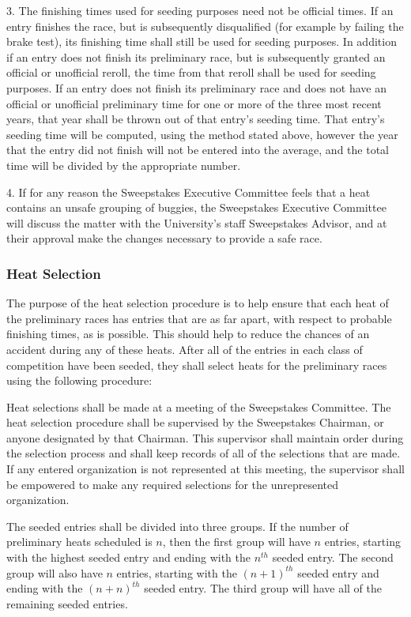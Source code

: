 3. The finishing times used for seeding purposes need not be official times. If an entry finishes the race, but is subsequently disqualified (for example by failing the brake test), its finishing time shall still be used for seeding purposes. In addition if an entry does not finish its preliminary race, but is subsequently granted an official or unofficial reroll, the time from that reroll shall be used for seeding purposes. If an entry does not finish its preliminary race and does not have an official or unofficial preliminary time for one or more of the three most recent years, that year shall be thrown out of that entry’s seeding time. That entry’s seeding time will be computed, using the method stated above, however the year that the entry did not finish will not be entered into the average, and the total time will be divided by the appropriate number.

4. If for any reason the Sweepstakes Executive Committee feels that a heat contains an unsafe grouping of buggies, the Sweepstakes Executive Committee will discuss the matter with the University’s staff Sweepstakes Advisor, and at their approval make the changes necessary to provide a safe race.

\subsubsection{Heat Selection}

The purpose of the heat selection procedure is to help ensure that each heat of the preliminary races has entries that are as far apart, with respect to probable finishing times, as is possible. This should help to reduce the chances of an accident during any of these heats. After all of the entries in each class of competition have been seeded, they shall select heats for the preliminary races using the following procedure:

Heat selections shall be made at a meeting of the Sweepstakes Committee. The heat selection procedure shall be supervised by the Sweepstakes Chairman, or anyone designated by that Chairman. This supervisor shall maintain order during the selection process and shall keep records of all of the selections that are made. If any entered organization is not represented at this meeting, the supervisor shall be empowered to make any required selections for the unrepresented organization.

The seeded entries shall be divided into three groups. If the number of preliminary heats scheduled is $n$, then the first group will have $n$ entries, starting with the highest seeded entry and ending with the $n^{th}$ seeded entry. The second group will also have $n$ entries, starting with the $(n+1)^{th}$ seeded entry and ending with the $(n+n)^{th}$ seeded entry. The third group will have all of the remaining seeded entries.

